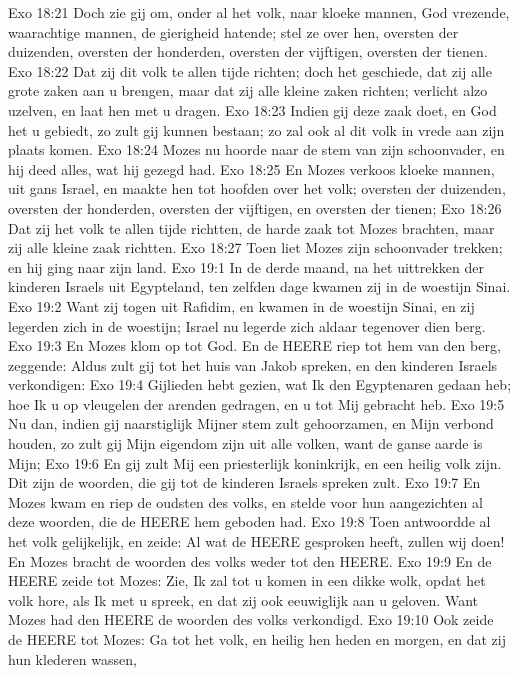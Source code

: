 Exo 18:21  Doch zie gij om, onder al het volk, naar kloeke mannen, God vrezende, waarachtige mannen, de gierigheid hatende; stel ze over hen, oversten der duizenden, oversten der honderden, oversten der vijftigen, oversten der tienen.
Exo 18:22  Dat zij dit volk te allen tijde richten; doch het geschiede, dat zij alle grote zaken aan u brengen, maar dat zij alle kleine zaken richten; verlicht alzo uzelven, en laat hen met u dragen.
Exo 18:23  Indien gij deze zaak doet, en God het u gebiedt, zo zult gij kunnen bestaan; zo zal ook al dit volk in vrede aan zijn plaats komen.
Exo 18:24  Mozes nu hoorde naar de stem van zijn schoonvader, en hij deed alles, wat hij gezegd had.
Exo 18:25  En Mozes verkoos kloeke mannen, uit gans Israel, en maakte hen tot hoofden over het volk; oversten der duizenden, oversten der honderden, oversten der vijftigen, en oversten der tienen;
Exo 18:26  Dat zij het volk te allen tijde richtten, de harde zaak tot Mozes brachten, maar zij alle kleine zaak richtten.
Exo 18:27  Toen liet Mozes zijn schoonvader trekken; en hij ging naar zijn land.
Exo 19:1  In de derde maand, na het uittrekken der kinderen Israels uit Egypteland, ten zelfden dage kwamen zij in de woestijn Sinai.
Exo 19:2  Want zij togen uit Rafidim, en kwamen in de woestijn Sinai, en zij legerden zich in de woestijn; Israel nu legerde zich aldaar tegenover dien berg.
Exo 19:3  En Mozes klom op tot God. En de HEERE riep tot hem van den berg, zeggende: Aldus zult gij tot het huis van Jakob spreken, en den kinderen Israels verkondigen:
Exo 19:4  Gijlieden hebt gezien, wat Ik den Egyptenaren gedaan heb; hoe Ik u op vleugelen der arenden gedragen, en u tot Mij gebracht heb.
Exo 19:5  Nu dan, indien gij naarstiglijk Mijner stem zult gehoorzamen, en Mijn verbond houden, zo zult gij Mijn eigendom zijn uit alle volken, want de ganse aarde is Mijn;
Exo 19:6  En gij zult Mij een priesterlijk koninkrijk, en een heilig volk zijn. Dit zijn de woorden, die gij tot de kinderen Israels spreken zult.
Exo 19:7  En Mozes kwam en riep de oudsten des volks, en stelde voor hun aangezichten al deze woorden, die de HEERE hem geboden had.
Exo 19:8  Toen antwoordde al het volk gelijkelijk, en zeide: Al wat de HEERE gesproken heeft, zullen wij doen! En Mozes bracht de woorden des volks weder tot den HEERE.
Exo 19:9  En de HEERE zeide tot Mozes: Zie, Ik zal tot u komen in een dikke wolk, opdat het volk hore, als Ik met u spreek, en dat zij ook eeuwiglijk aan u geloven. Want Mozes had den HEERE de woorden des volks verkondigd.
Exo 19:10  Ook zeide de HEERE tot Mozes: Ga tot het volk, en heilig hen heden en morgen, en dat zij hun klederen wassen,
